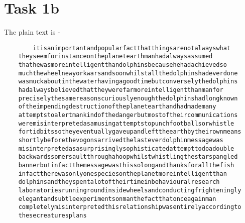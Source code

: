 \documentclass{article}
\begin{document}
    \section*{Task 1b}
    The plain text is - 
    \begin{verbatim}
        itisanimportantandpopularfactthatthingsarenotalwayswhat
    theyseemforinstanceontheplanetearthmanhadalwaysassumed
    thathewasmoreintelligentthandolphinsbecausehehadachievedso
    muchthewheelnewyorkwarsandsoonwhilstallthedolphinshadeverdone
    wasmuckaboutinthewaterhavingagoodtimebutconverselythedolphins
    hadalwaysbelievedthattheywerefarmoreintelligentthanmanfor
    preciselythesamereasonscuriouslyenoughthedolphinshadlongknown
    oftheimpendingdestructionoftheplanetearthandhadmademany
    attemptstoalertmankindofthedangerbutmostoftheircommunications
    weremisinterpretedasamusingattemptstopunchfootballsorwhistle
    fortidbitssotheyeventuallygaveupandlefttheearthbytheirownmeans
    shortlybeforethevogonsarrivedthelasteverdolphinmessagewas
    misinterpretedasasurprisinglysophisticatedattempttodoadouble
    backwardssomersaultthroughahoopwhilstwhistlingthestarspangled
    bannerbutinfactthemessagewasthissolongandthanksforallthefish
    infacttherewasonlyonespeciesontheplanetmoreintelligentthan
    dolphinsandtheyspentalotoftheirtimeinbehaviouralresearch
    laboratoriesrunningroundinsidewheelsandconductingfrighteningly
    elegantandsubtleexperimentsonmanthefactthatonceagainman
    completelymisinterpretedthisrelationshipwasentirelyaccordingto
    thesecreaturesplans
    \end{verbatim}
\end{document}
